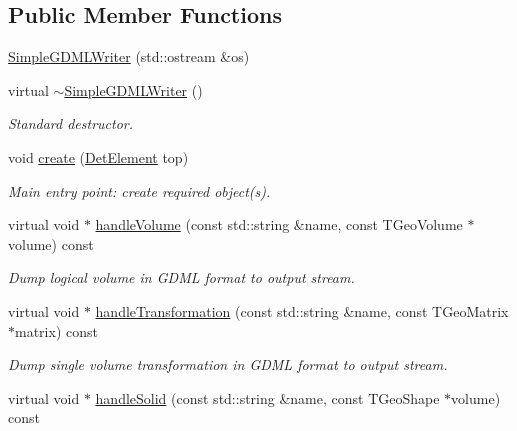\subsection*{Public Member Functions}
\begin{DoxyCompactItemize}
\item 
\hyperlink{class_d_d4hep_1_1_geometry_1_1_simple_g_d_m_l_writer_a15eda8337c0e6b902ca91bd3cf5dd9a0}{SimpleGDMLWriter} (std::ostream \&os)
\item 
virtual \hyperlink{class_d_d4hep_1_1_geometry_1_1_simple_g_d_m_l_writer_ae3b2fd4273d79d7e59526531da0e9b96}{$\sim$SimpleGDMLWriter} ()
\begin{DoxyCompactList}\small\item\em Standard destructor. \item\end{DoxyCompactList}\item 
void \hyperlink{class_d_d4hep_1_1_geometry_1_1_simple_g_d_m_l_writer_a0ccf6cfb7ec9346ee6e5bba56f2a151a}{create} (\hyperlink{class_d_d4hep_1_1_geometry_1_1_det_element}{DetElement} top)
\begin{DoxyCompactList}\small\item\em Main entry point: create required object(s). \item\end{DoxyCompactList}\item 
virtual void $\ast$ \hyperlink{class_d_d4hep_1_1_geometry_1_1_simple_g_d_m_l_writer_a1ff1d6d4cb53ee0e3990e10b54fa4983}{handleVolume} (const std::string \&name, const TGeoVolume $\ast$volume) const 
\begin{DoxyCompactList}\small\item\em Dump logical volume in GDML format to output stream. \item\end{DoxyCompactList}\item 
virtual void $\ast$ \hyperlink{class_d_d4hep_1_1_geometry_1_1_simple_g_d_m_l_writer_ababbd95c6645b282fdde7fcff6e0ceb5}{handleTransformation} (const std::string \&name, const TGeoMatrix $\ast$matrix) const 
\begin{DoxyCompactList}\small\item\em Dump single volume transformation in GDML format to output stream. \item\end{DoxyCompactList}\item 
virtual void $\ast$ \hyperlink{class_d_d4hep_1_1_geometry_1_1_simple_g_d_m_l_writer_a77a44b4f0061288ba94126a2e2ef8cc0}{handleSolid} (const std::string \&name, const TGeoShape $\ast$volume) const 

\end{DoxyCompactItemize}
